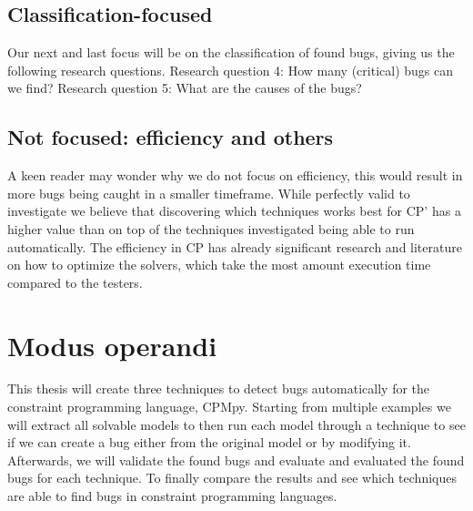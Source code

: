 
\subsection{Classification-focused}
\label{intro:RQ:ClassificationFocused}
Our next and last focus will be on the classification of found bugs, giving us the following research questions. \newline
Research question 4: How many (critical) bugs can we find? \newline
Research question 5: What are the causes of the bugs? \newline

\subsection{Not focused: efficiency and others}
\label{intro:RQ:NotFocused}
A keen reader may wonder why we do not focus on efficiency, this would result in more bugs being caught in a smaller timeframe. While perfectly valid to investigate we believe that discovering which techniques works best for CP' has a higher value than on top of the techniques investigated being able to run automatically. The efficiency in CP has already significant research and literature on how to optimize the solvers, which take the most amount execution time compared to the testers.



\section{Modus operandi}
This thesis will create three techniques to detect bugs automatically for the constraint programming language, CPMpy. Starting from multiple examples we will extract all solvable models to then run each model through a technique to see if we can create a bug either from the original model or by modifying it. Afterwards, we will validate the found bugs and evaluate and evaluated the found bugs for each technique. To finally compare the results and see which techniques are able to find bugs in constraint programming languages.




